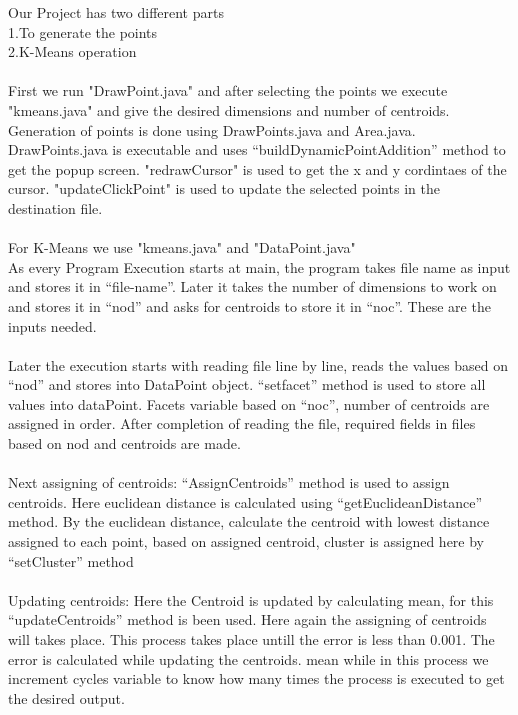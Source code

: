 \documentclass[11pt]{article}
\begin{document}
Our Project has two different parts\\
1.To generate the points\\
2.K-Means operation\\
\\
First we run "DrawPoint.java" and after selecting the points 
we execute "kmeans.java" and give the desired dimensions and number of centroids.
\\
Generation of points is done using DrawPoints.java and Area.java.
DrawPoints.java is executable and uses ``buildDynamicPointAddition'' method to get the popup screen.
"redrawCursor" is used to get the x and y cordintaes of the cursor.
"updateClickPoint" is used to update the selected points in the destination file.\\
\\
For K-Means we use "kmeans.java" and "DataPoint.java"\\
As every Program Execution starts at main, the program takes file name as input and stores it in ``file-name''. 
Later it takes the number of dimensions to work on and stores it in ``nod'' and asks for centroids to store it in ``noc''. These are the inputs needed.\\
\\
Later the execution starts with reading file line by line, reads the values based on ``nod'' and stores into DataPoint object.
``setfacet'' method is used to store all values into dataPoint.
Facets variable based on ``noc'', number of centroids are assigned in order. 
After completion of reading the file, required fields in files based on nod and centroids are made.\\
\\
Next assigning of centroids: ``AssignCentroids'' method is used to assign centroids. Here euclidean distance is calculated using
``getEuclideanDistance'' method. By the euclidean distance, calculate the centroid with lowest distance assigned to each point, 
based on assigned centroid, cluster is assigned here by ``setCluster'' method\\
\\
Updating centroids: Here the Centroid is updated by calculating mean, for this ``updateCentroids'' method is been used.
Here again the assigning of centroids will takes place. This process takes place untill the error is less than 0.001.
The error is calculated while updating the centroids. mean while in this process we increment cycles variable to know how
many times the process is executed to get the desired output.\\
\\
\end{document}
